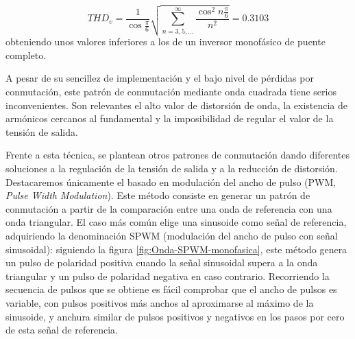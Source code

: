 \begin{equation}
THD_{v}=\frac{1}{\cos\frac{\pi}{6}}\sqrt{\sum_{n=3,5,...}^{\infty}\frac{\cos^{2}n\frac{\pi}{6}}{n^{2}}}=0.3103\label{eq:THDTrifasicoCuadrada}\end{equation}
obteniendo unos valores inferiores a los de un inversor monofásico
de puente completo.

A pesar de su sencillez de implementación y el bajo nivel de pérdidas
por conmutación, este patrón de conmutación mediante onda cuadrada
tiene serios inconvenientes. Son relevantes el alto valor de distorsión
de onda, la existencia de armónicos cercanos al fundamental y la imposibilidad
de regular el valor de la tensión de salida.

Frente a esta técnica, se plantean otros patrones de conmutación dando
diferentes soluciones a la regulación de la tensión de salida y a
la reducción de distorsión. Destacaremos únicamente el basado en modulación
del ancho de pulso (PWM, \emph{Pulse Width Modulation}). Este método
consiste en generar un patrón de conmutación a partir de la comparación
entre una onda de referencia con una onda triangular. El caso más
común elige una sinusoide como señal de referencia, adquiriendo la
denominación SPWM (modulación del ancho de pulso con señal
sinusoidal): siguiendo la figura \ref{fig:Onda-SPWM-monofasica}, este
método genera un pulso de polaridad positiva cuando la señal
sinusoidal supera a la onda triangular y un pulso de polaridad
negativa en caso contrario. Recorriendo la secuencia de pulsos que se
obtiene es fácil comprobar que el ancho de pulsos es variable, con
pulsos positivos más anchos al aproximarse al máximo de la sinusoide,
y anchura similar de pulsos positivos y negativos en los pasos por
cero de esta señal de referencia.

